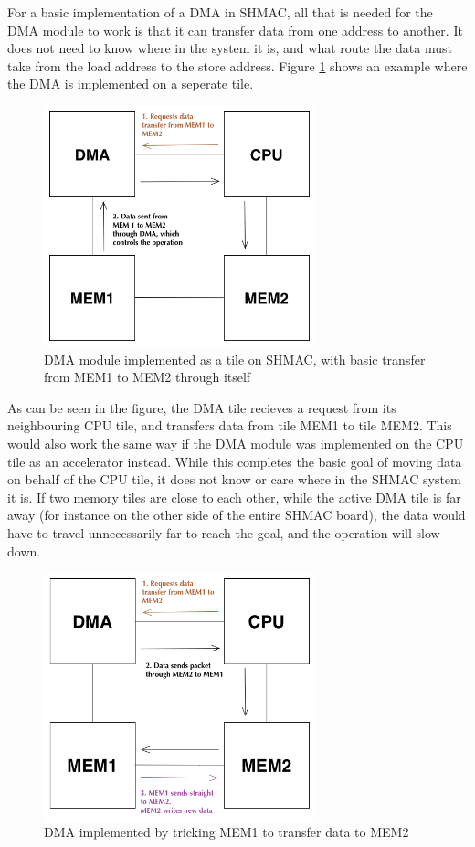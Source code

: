 For a basic implementation of a DMA in SHMAC, all that is needed for the DMA module to work is that it can transfer data from one address to another.
It does not need to know where in the system it is, and what route the data must take from the load address to the store address.
Figure \ref{fig:DMASHMAC1} shows an example where the DMA is implemented on a seperate tile.

\begin{figure}[h!]
    \centering
    \includegraphics[width=0.7\textwidth]{Figures/DMA/DMASHMAC1}
    \caption{DMA module implemented as a tile on SHMAC, with basic transfer from MEM1 to MEM2 through itself}
    \label{fig:DMASHMAC1}
\end{figure}
 
As can be seen in the figure, the DMA tile recieves a request from its neighbouring CPU tile, and transfers data  from tile MEM1 to tile MEM2.
This would also work the same way if the DMA module was implemented on the CPU tile as an accelerator instead.
While this completes the basic goal of moving data on behalf of the CPU tile, it does not know or care where in the SHMAC system it is.
If two memory tiles are close to each other, while the active DMA tile is far away (for instance on the other side of the entire SHMAC board), the data would have to travel unnecessarily far to reach the goal, and the operation will slow down.

\begin{figure}[h!]
    \centering
    \includegraphics[width=0.7\textwidth]{Figures/DMA/DMASHMAC2}
    \caption{DMA implemented by tricking MEM1 to transfer data to MEM2}
    \label{fig:DMASHMAC2}
\end{figure}


